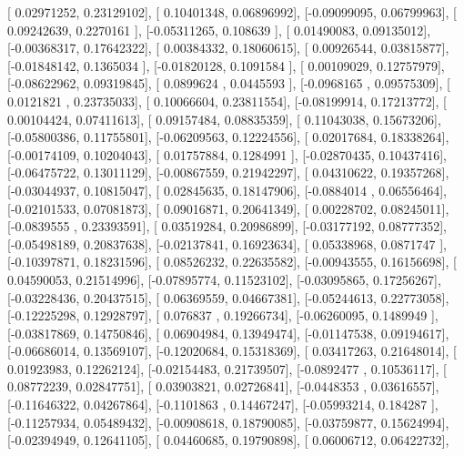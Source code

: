 \documentclass{article}
\begin{document}
       [ 0.02971252,  0.23129102],
       [ 0.10401348,  0.06896992],
       [-0.09099095,  0.06799963],
       [ 0.09242639,  0.2270161 ],
       [-0.05311265,  0.108639  ],
       [ 0.01490083,  0.09135012],
       [-0.00368317,  0.17642322],
       [ 0.00384332,  0.18060615],
       [ 0.00926544,  0.03815877],
       [-0.01848142,  0.1365034 ],
       [-0.01820128,  0.1091584 ],
       [ 0.00109029,  0.12757979],
       [-0.08622962,  0.09319845],
       [ 0.0899624 ,  0.0445593 ],
       [-0.0968165 ,  0.09575309],
       [ 0.0121821 ,  0.23735033],
       [ 0.10066604,  0.23811554],
       [-0.08199914,  0.17213772],
       [ 0.00104424,  0.07411613],
       [ 0.09157484,  0.08835359],
       [ 0.11043038,  0.15673206],
       [-0.05800386,  0.11755801],
       [-0.06209563,  0.12224556],
       [ 0.02017684,  0.18338264],
       [-0.00174109,  0.10204043],
       [ 0.01757884,  0.1284991 ],
       [-0.02870435,  0.10437416],
       [-0.06475722,  0.13011129],
       [-0.00867559,  0.21942297],
       [ 0.04310622,  0.19357268],
       [-0.03044937,  0.10815047],
       [ 0.02845635,  0.18147906],
       [-0.0884014 ,  0.06556464],
       [-0.02101533,  0.07081873],
       [ 0.09016871,  0.20641349],
       [ 0.00228702,  0.08245011],
       [-0.0839555 ,  0.23393591],
       [ 0.03519284,  0.20986899],
       [-0.03177192,  0.08777352],
       [-0.05498189,  0.20837638],
       [-0.02137841,  0.16923634],
       [ 0.05338968,  0.0871747 ],
       [-0.10397871,  0.18231596],
       [ 0.08526232,  0.22635582],
       [-0.00943555,  0.16156698],
       [ 0.04590053,  0.21514996],
       [-0.07895774,  0.11523102],
       [-0.03095865,  0.17256267],
       [-0.03228436,  0.20437515],
       [ 0.06369559,  0.04667381],
       [-0.05244613,  0.22773058],
       [-0.12225298,  0.12928797],
       [ 0.076837  ,  0.19266734],
       [-0.06260095,  0.1489949 ],
       [-0.03817869,  0.14750846],
       [ 0.06904984,  0.13949474],
       [-0.01147538,  0.09194617],
       [-0.06686014,  0.13569107],
       [-0.12020684,  0.15318369],
       [ 0.03417263,  0.21648014],
       [ 0.01923983,  0.12262124],
       [-0.02154483,  0.21739507],
       [-0.0892477 ,  0.10536117],
       [ 0.08772239,  0.02847751],
       [ 0.03903821,  0.02726841],
       [-0.0448353 ,  0.03616557],
       [-0.11646322,  0.04267864],
       [-0.1101863 ,  0.14467247],
       [-0.05993214,  0.184287  ],
       [-0.11257934,  0.05489432],
       [-0.00908618,  0.18790085],
       [-0.03759877,  0.15624994],
       [-0.02394949,  0.12641105],
       [ 0.04460685,  0.19790898],
       [ 0.06006712,  0.06422732],
\end{document}
